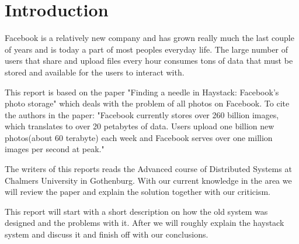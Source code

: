 \section{Introduction}
Facebook is a relatively new company and has grown really much the last couple of years and is today a part of most peoples everyday life. The large number of users that share and upload files every hour consumes tons of data that must be stored and available for the users to interact with. 

This report is based on the paper "Finding a needle in Haystack: Facebook's photo storage" which deals with the problem of all photos on Facebook. To cite the authors in the paper: "Facebook currently stores over 260 billion images, which translates to over 20 petabytes of data. Users upload one billion new photos(about 60 terabyte) each week and Facebook serves over one million images per second at peak." 

The writers of this reports reads the Advanced course of Distributed Systems at Chalmers University in Gothenburg. With our current knowledge in the area we will review the paper and explain the solution together with our criticism.

This report will start with a short description on how the old system was designed and the problems with it. After we will roughly explain the haystack system and discuss it and finish off with our conclusions.
